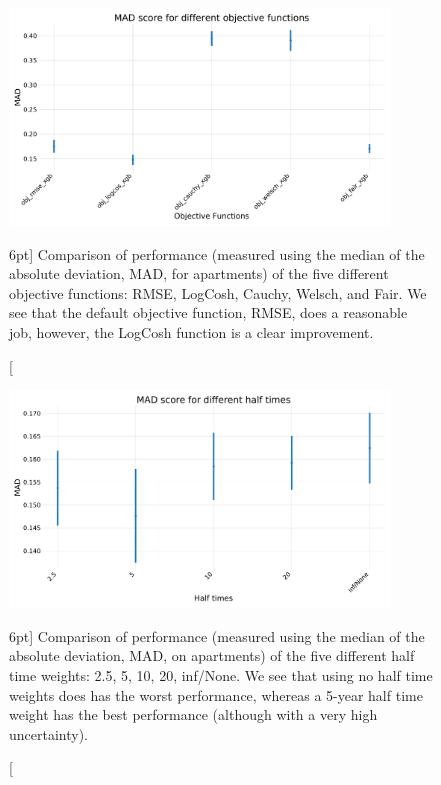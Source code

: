 \documentclass[a4paper, twoside, nobib]{tufte-book}
\begin{document}
\begin{figure}
  \includegraphics[width=0.9\textwidth, trim=0 35 0 40, clip]{figures/housing/Ejerlejlighed_v17_cut_all_Ncols_all__MAD_gridsearch_obj.pdf}
  \caption[Comparison of different objective functions][6pt]
          {Comparison of performance (measured using the median of the absolute deviation, MAD, for apartments) of the five different objective functions: RMSE, LogCosh, Cauchy, Welsch, and Fair. We see that the default objective function, RMSE, does a reasonable job, however, the LogCosh function is a clear improvement.
          } 
  \label{fig:h:objective_functions_performance}
\end{figure}



\begin{figure}
  \includegraphics[width=0.9\textwidth, trim=0 0 0 40, clip]{figures/housing/Ejerlejlighed_v17_cut_all_Ncols_all__MAD_gridsearch_half.pdf}
  \caption[Comparison of different half times weights][6pt]
          {Comparison of performance (measured using the median of the absolute deviation, MAD, on apartments) of the five different half time weights: 2.5, 5, 10, 20, inf/None. We see that using no half time weights does has the worst performance, whereas a 5-year half time weight has the best performance (although with a very high uncertainty).
          } 
  \label{fig:h:half_time_performance}
\end{figure}
\end{document}
